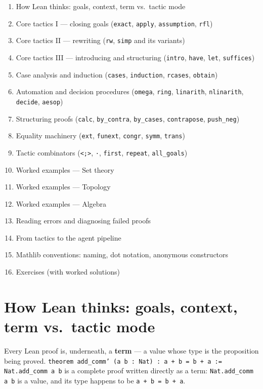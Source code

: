 \begin{enumerate}
  \item How Lean thinks: goals, context, term vs.\ tactic mode
  \item Core tactics I --- closing goals (\texttt{exact}, \texttt{apply}, \texttt{assumption}, \texttt{rfl})
  \item Core tactics II --- rewriting (\texttt{rw}, \texttt{simp} and its variants)
  \item Core tactics III --- introducing and structuring (\texttt{intro}, \texttt{have}, \texttt{let}, \texttt{suffices})
  \item Case analysis and induction (\texttt{cases}, \texttt{induction}, \texttt{rcases}, \texttt{obtain})
  \item Automation and decision procedures (\texttt{omega}, \texttt{ring}, \texttt{linarith}, \texttt{nlinarith}, \texttt{decide}, \texttt{aesop})
  \item Structuring proofs (\texttt{calc}, \texttt{by\_contra}, \texttt{by\_cases}, \texttt{contrapose}, \texttt{push\_neg})
  \item Equality machinery (\texttt{ext}, \texttt{funext}, \texttt{congr}, \texttt{symm}, \texttt{trans})
  \item Tactic combinators (\texttt{<;>}, \texttt{·}, \texttt{first}, \texttt{repeat}, \texttt{all\_goals})
  \item Worked examples --- Set theory
  \item Worked examples --- Topology
  \item Worked examples --- Algebra
  \item Reading errors and diagnosing failed proofs
  \item From tactics to the agent pipeline
  \item Mathlib conventions: naming, dot notation, anonymous constructors
  \item Exercises (with worked solutions)
\end{enumerate}

\section{How Lean thinks: goals, context, term vs.\ tactic mode}

Every Lean proof is, underneath, a \textbf{term} --- a value whose type is the proposition being proved. \texttt{theorem add\_comm' (a b : Nat) : a + b = b + a := Nat.add\_comm a b} is a complete proof written directly as a term: \texttt{Nat.add\_comm a b} is a value, and its type happens to be \texttt{a + b = b + a}.

